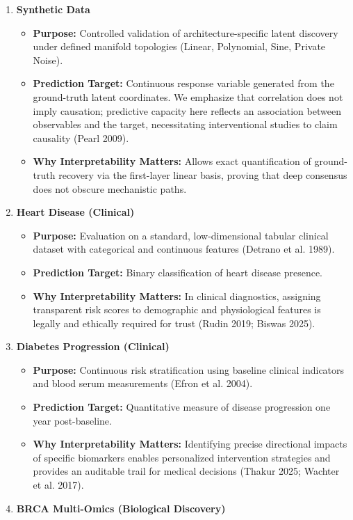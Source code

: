 \documentclass[
  letterpaper,
]{report}
\providecommand{\tightlist}{%
  \setlength{\itemsep}{0pt}\setlength{\parskip}{0pt}}
\begin{document}
\begin{enumerate}
\def\labelenumi{\arabic{enumi}.}
\tightlist
\item
  \textbf{Synthetic Data}

  \begin{itemize}
  \tightlist
  \item
    \textbf{Purpose:} Controlled validation of architecture-specific
    latent discovery under defined manifold topologies (Linear,
    Polynomial, Sine, Private Noise).
  \item
    \textbf{Prediction Target:} Continuous response variable generated
    from the ground-truth latent coordinates. We emphasize that
    correlation does not imply causation; predictive capacity here
    reflects an association between observables and the target,
    necessitating interventional studies to claim causality (Pearl
    2009).
  \item
    \textbf{Why Interpretability Matters:} Allows exact quantification
    of ground-truth recovery via the first-layer linear basis, proving
    that deep consensus does not obscure mechanistic paths.
  \end{itemize}
\item
  \textbf{Heart Disease (Clinical)}

  \begin{itemize}
  \tightlist
  \item
    \textbf{Purpose:} Evaluation on a standard, low-dimensional tabular
    clinical dataset with categorical and continuous features (Detrano
    et al. 1989).
  \item
    \textbf{Prediction Target:} Binary classification of heart disease
    presence.
  \item
    \textbf{Why Interpretability Matters:} In clinical diagnostics,
    assigning transparent risk scores to demographic and physiological
    features is legally and ethically required for trust (Rudin 2019;
    Biswas 2025).
  \end{itemize}
\item
  \textbf{Diabetes Progression (Clinical)}

  \begin{itemize}
  \tightlist
  \item
    \textbf{Purpose:} Continuous risk stratification using baseline
    clinical indicators and blood serum measurements (Efron et al.
    2004).
  \item
    \textbf{Prediction Target:} Quantitative measure of disease
    progression one year post-baseline.
  \item
    \textbf{Why Interpretability Matters:} Identifying precise
    directional impacts of specific biomarkers enables personalized
    intervention strategies and provides an auditable trail for medical
    decisions (Thakur 2025; Wachter et al. 2017).
  \end{itemize}
\item
  \textbf{BRCA Multi-Omics (Biological Discovery)}


\end{enumerate}
\end{document}
